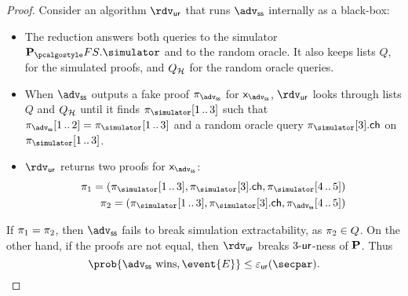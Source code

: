 \documentclass[runningheads,11pt]{llncs}
\theoremstyle{definition}
\begin{document}
\begin{proof}
Consider an algorithm $\rdvur$ that runs $\advss$ internally as a black-box:
\begin{itemize}
	\item The reduction answers both queries to the simulator $\plonkprotfs.\simulator$ and to the random oracle. 
	It also keeps lists $Q$, for the simulated proofs, and $Q_{\mathcal{H}}$ for the random oracle queries. 
	\item When $\advss$ outputs a fake proof $\zkproof_{\advss}$ for  $\inp_\advss$, $\rdvur$ looks through lists $Q$ and $Q_{\mathcal{H}}$ until it finds 
	$\zkproof_{\simulator}\range{1}{3}$ such that $\zkproof_{\advss}\range{1}{2} = \zkproof_{\simulator}\range{1}{3}$ and a random oracle query $\zkproof_{\simulator}[3].\ch$ on $\zkproof_{\simulator}\range{1}{3}$.
	\item $\rdvur$ returns two proofs for $\inp_\advss$:
	\begin{align*}
		\zkproof_1 = (\zkproof_{\simulator}\range{1}{3}, \zkproof_{\simulator}[3].\ch, \zkproof_{\simulator}\range{4}{5})\\
		\zkproof_2 = (\zkproof_{\simulator}\range{1}{3}, \zkproof_{\simulator}[3].\ch, \zkproof_{\advss}\range{4}{5})
	\end{align*}
	\end{itemize}  
	If $\pi_1 = \pi_2$, then $\advss$ fails to break simulation extractability, as $\pi_2 \in Q$.
	On the other hand, if the proofs are not equal, then $\rdvur$ breaks ${3\text{-}\mathsf{ur}}$-ness of $\mathbf{P}$. Thus 
	\[
		\prob{\advss \text{ wins}, \event{E}} \leq \epsur(\secpar).
	\]


\end{proof}
\end{document}
